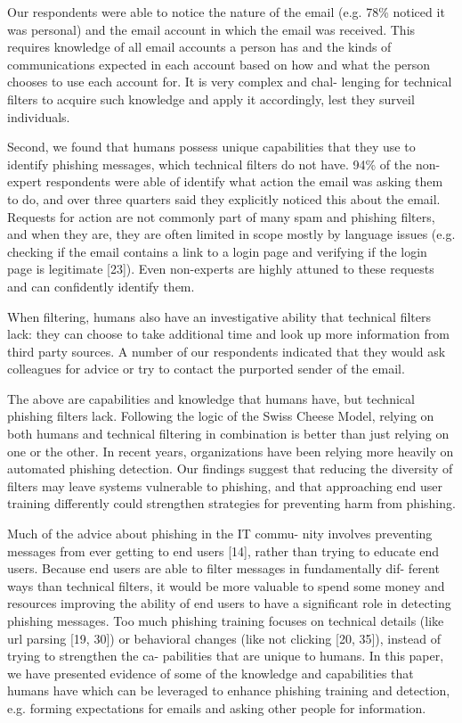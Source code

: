 \documentclass[lettersize,journal]{IEEEtran}
\begin{document}
Our respondents were able to notice the nature of the email (e.g. 78\% noticed
it was personal) and the email account in which the email was received. This
requires knowledge of all email accounts a person has and the kinds of
communications expected in each account based on how and what the person
chooses to use each account for. It is very complex and chal- lenging for
technical filters to acquire such knowledge and apply it accordingly, lest they
surveil individuals.

Second, we found that humans possess unique capabilities that they use to
identify phishing messages, which technical filters do not have. 94\% of the
non-expert respondents were able of identify what action the email was asking
them to do, and over three quarters said they explicitly noticed this about the
email. Requests for action are not commonly part of many spam and phishing
filters, and when they are, they are often limited in scope mostly by language
issues (e.g. checking if the email contains a link to a login page and
verifying if the login page is legitimate [23]). Even non-experts are highly
attuned to these requests and can confidently identify them.

When filtering, humans also have an investigative ability that technical
filters lack: they can choose to take additional time and look up more
information from third party sources. A number of our respondents indicated
that they would ask colleagues for advice or try to contact the purported
sender of the email.

The above are capabilities and knowledge that humans have, but technical
phishing filters lack. Following the logic of the Swiss Cheese Model, relying
on both humans and technical filtering in combination is better than just
relying on one or the other. In recent years, organizations have been relying
more heavily on automated phishing detection. Our findings suggest that
reducing the diversity of filters may leave systems vulnerable to phishing, and
that approaching end user training differently could strengthen strategies for
preventing harm from phishing.

Much of the advice about phishing in the IT commu- nity involves preventing
messages from ever getting to end users [14], rather than trying to educate end
users. Because end users are able to filter messages in fundamentally dif-
ferent ways than technical filters, it would be more valuable to spend some
money and resources improving the ability of end users to have a significant
role in detecting phishing messages. Too much phishing training focuses on
technical details (like url parsing [19, 30]) or behavioral changes (like not
clicking [20, 35]), instead of trying to strengthen the ca- pabilities that are
unique to humans. In this paper, we have presented evidence of some of the
knowledge and capabilities that humans have which can be leveraged to enhance
phishing training and detection, e.g. forming expectations for emails and
asking other people for information.
\end{document}
